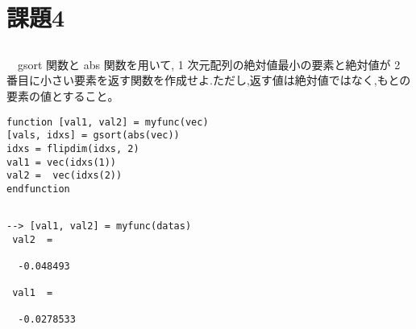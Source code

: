 \documentclass{scrartcl}
\begin{document}
\section{課題4}
\label{sec:org901e674}
\subsection{}
\label{sec:orgcee286a}
　gsort 関数と abs 関数を用いて, 1 次元配列の絶対値最小の要素と絶対値が 2 番目に小さい要素を返す関数を作成せよ.ただし,返す値は絶対値ではなく,もとの\\
要素の値とすること。\\
\begin{verbatim}
function [val1, val2] = myfunc(vec)
[vals, idxs] = gsort(abs(vec))
idxs = flipdim(idxs, 2)
val1 = vec(idxs(1))
val2 =  vec(idxs(2))
endfunction
\end{verbatim}

\subsection{}
\label{sec:org4d1a58d}
\begin{verbatim}
--> [val1, val2] = myfunc(datas)
 val2  = 

  -0.048493

 val1  = 

  -0.0278533
\end{verbatim}
\end{document}
